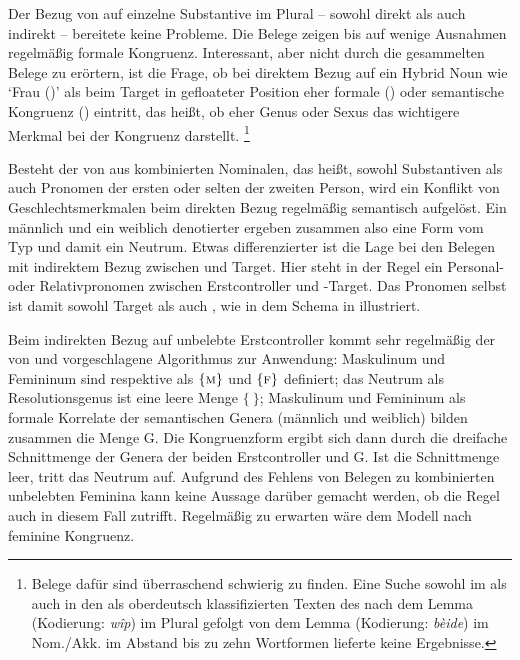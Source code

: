 Der Bezug von  auf einzelne Substantive im Plural -- sowohl direkt
als auch indirekt -- bereitete keine Probleme. Die Belege zeigen bis auf wenige
Ausnahmen regelmäßig formale Kongruenz. Interessant, aber nicht
durch die gesammelten Belege zu erörtern, ist die Frage, ob bei direktem Bezug
auf ein Hybrid Noun wie  `Frau (\NeutF)' als  beim
Target in gefloateter Position eher formale () oder semantische
Kongruenz () eintritt, das heißt, ob eher Genus oder Sexus das
wichtigere Merkmal bei der Kongruenz darstellt.%
%
	\footnote{Belege dafür sind überraschend schwierig zu finden. Eine Suche
		sowohl im \CAO{} als auch in den als oberdeutsch
		klassifizierten Texten des \REM{} nach dem Lemma  (Kodierung:
		\emph{wîp}) im Plural gefolgt von dem Lemma  (Kodierung:
		\emph{bèide}) im Nom./Akk. im Abstand bis zu zehn Wortformen lieferte
		keine Ergebnisse.}

Besteht der  von  aus kombinierten Nominalen, das
heißt, sowohl Substantiven als auch Pronomen der ersten oder selten der zweiten
Person, wird ein Konflikt von Geschlechtsmerkmalen beim direkten Bezug
regelmäßig semantisch aufgelöst. Ein männlich und ein weiblich denotierter
 ergeben zusammen also eine Form vom Typ  und
damit ein Neutrum. Etwas differenzierter ist die Lage bei den Belegen mit
indirektem Bezug zwischen  und Target. Hier steht in der Regel
ein Personal- oder Relativpronomen zwischen Erstcontroller und
-Target. Das Pronomen selbst ist damit sowohl Target als auch
, wie in dem Schema in  illustriert.

Beim indirekten Bezug auf unbelebte Erstcontroller kommt sehr regelmäßig der
von \citet[577]{wechsler2009} und \citet[184]{wechslerzlatic2003}
vorgeschlagene Algorithmus zur Anwendung: Maskulinum und Femininum sind
respektive als $\{\textsc{m}\}$ und $\{\textsc{f}\}$ definiert; das Neutrum als
Resolutionsgenus ist eine leere Menge $\{\ \}$; Maskulinum und Femininum als
formale Korrelate der semantischen Genera (männlich und weiblich) bilden
zusammen die Menge G. Die Kongruenzform ergibt sich dann durch die
dreifache Schnittmenge der Genera der beiden Erstcontroller und G. Ist
die Schnittmenge leer, tritt das Neutrum auf. Aufgrund des Fehlens von Belegen
zu kombinierten unbelebten Feminina kann keine Aussage darüber gemacht werden,
ob die Regel auch in diesem Fall zutrifft. Regelmäßig zu erwarten wäre dem
Modell nach feminine Kongruenz.

